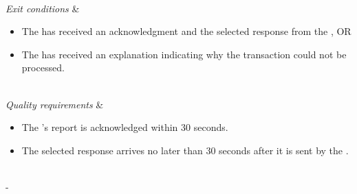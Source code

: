 \begin{table}[h!]
\begin{tabu}
\begin{itemize}[leftmargin=*,topsep=0pt,itemsep=-1ex]
	\end{itemize} \\
	\hline
	\textit{Exit conditions} &
	\vspace{-3mm}
	\begin{itemize}[leftmargin=*,topsep=0pt,itemsep=-1ex]
		\item The \fieldofficer has received an acknowledgment and the selected response from the \dispatcher, OR
		\item The \fieldofficer has received an explanation indicating why the transaction could not be processed.
	\end{itemize} \\
	\hline
	\textit{Quality \newline requirements} &
	\vspace{-3mm}
	\begin{itemize}[leftmargin=*,topsep=0pt,itemsep=-1ex]
		\item The \fieldofficer's report is acknowledged within 30 seconds.
		\item The selected response arrives no later than 30 seconds after it is sent by the \dispatcher.
	\end{itemize} \\
	\tabucline[1.5pt]-
\end{tabu}
\caption{Example of a use case. (p129 in OOSE)}
\label{uc:reportEmergency}
\end{table}
